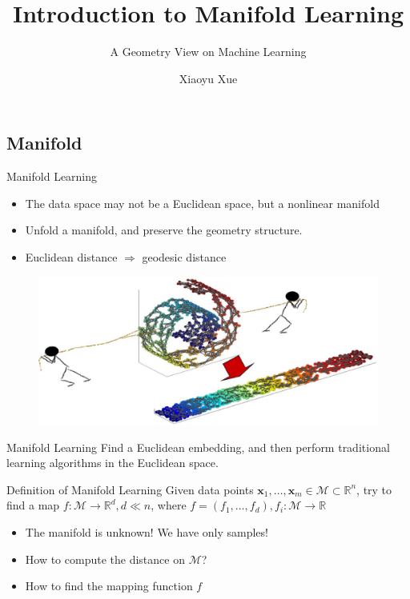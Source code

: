 \documentclass{beamer}
\title{Introduction to Manifold Learning} %
\subtitle{A Geometry View on Machine Learning} %
\author{Xiaoyu Xue}
\newcommand{\bol}[1]{\textbf{#1}}
\begin{document}
  \frame{\maketitle}


  \begin{darkframes}
    \section{Manifold}
    
    \begin{frame}{Manifold Learning}
    \begin{itemize}
    	\item The data space may not be a Euclidean space, but a nonlinear manifold
    	\item Unfold a manifold, and preserve the geometry structure.
    	\item Euclidean distance $\Longrightarrow$ geodesic distance
    \end{itemize}
	\begin{figure}
	\centering
	\includegraphics[scale=0.2]{./figs/fig1.eps}
	\end{figure}
    \end{frame}

    \begin{frame}{Manifold Learning}
    Find a Euclidean embedding, and then perform traditional learning algorithms in the Euclidean space.
	\begin{block}{Definition of Manifold Learning}
	Given data points $\bol{x}_1, \ldots, \bol{x}_m \in \mathcal{M} \subset \mathbb{R}^n$, try to find a map $f : \mathcal{M} \to \mathbb{R}^d, d\ll n$, where $f = (f_1, \ldots, f_d), f_i : \mathcal{M} \to \mathbb{R}$
	\end{block}
 	\begin{itemize}
 		\item The manifold is unknown! We have only samples!
		\item How to compute the distance on $\mathcal{M}$?
		\item How to find the mapping function $f$
 	\end{itemize}
    \end{frame}


\end{darkframes}
\end{document}
